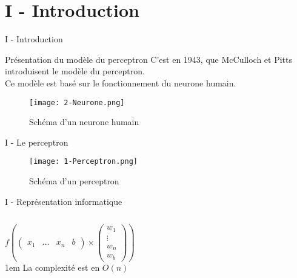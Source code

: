 
\section{I - Introduction}
\begin{frame}{I - Introduction}
	\begin{block}{Présentation du modèle du perceptron}
		C'est  en 1943, que McCulloch et Pitts introduisent le modèle du perceptron.  \\
		Ce modèle est basé sur le fonctionnement du neurone humain.
	\end{block}
	\begin{figure}
		\centering
		\texttt{[image: 2-Neurone.png]}
		\caption{Schéma d'un neurone humain}
	\end{figure}
\end{frame}


\begin{frame}{I - Le perceptron}
	\begin{figure}
		\centering
		\texttt{[image: 1-Perceptron.png]}
		\caption{Schéma d'un perceptron}
	\end{figure}
\end{frame}


\begin{frame}{I - Représentation informatique}
	\begin{columns}
		\begin{column}[]{0.4\textwidth}
			\begin{center}
				$
					f
					\left(
					\begin{pmatrix}
						x_1 & \ldots & x_n & b
					\end{pmatrix}
					\times
					\begin{pmatrix}
						w_1    \\
						\vdots \\
						w_n    \\
						w_b
					\end{pmatrix}
					\right)
				$ \\
				\openup 1em
				La complexité est en $O(n)$
			\end{center}
		\end{column}
		\begin{column}[]{0.5\textwidth}
			
		\end{column}
	\end{columns}
	\caption{Représentation informatique du perceptron}
\end{frame}